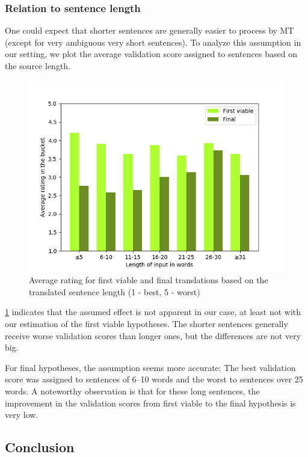 \subsubsection{Relation to sentence length}

One could expect that shorter sentences are generally easier to process by MT (except for very ambiguous very short sentences). To analyze this assumption in our setting, we plot the average validation score assigned to sentences based on the source length.

\begin{figure}[ht]
    \centering
    \includegraphics[width=0.8\linewidth]{img/experiment/qa_sentence_length.png}
    \caption{\label{fig:qa_sentence_length} Average rating for first viable and final translations based on the translated sentence length (1 - best, 5 - worst)}
\end{figure}

\cref{fig:qa_sentence_length} indicates that the assumed effect is not apparent in our case, at least not with our estimation of the first viable hypotheses. The shorter sentences generally receive worse validation scores than longer ones, but the differences are not very big.

For final hypotheses, the assumption seems more accurate: The best validation score was assigned to sentences of 6--10 words and the worst to sentences over 25 words. A noteworthy observation is that for these long sentences, the improvement in the validation scores from first viable to the final hypothesis is very low.

\subsection{Conclusion}

